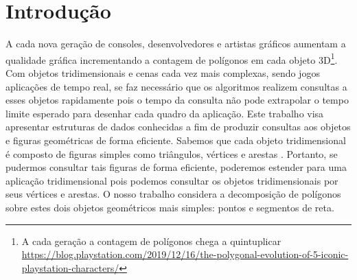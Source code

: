 \chapter{Introdução}\label{cap:intro}

A cada nova geração de consoles, desenvolvedores e artistas gráficos aumentam a  qualidade gráfica incrementando a contagem de polígonos em cada objeto 3D\footnote{A cada geração a contagem de polígonos chega a quintuplicar \url{https://blog.playstation.com/2019/12/16/the-polygonal-evolution-of-5-iconic-playstation-characters/}}. Com objetos tridimensionais e cenas cada vez mais complexas, sendo jogos aplicações de tempo real, se faz necessário que os algoritmos realizem consultas a esses objetos rapidamente pois o tempo da consulta não pode extrapolar o tempo limite esperado para desenhar cada quadro da aplicação.
Este trabalho visa apresentar estruturas de dados conhecidas a fim de produzir consultas aos objetos e figuras geométricas de forma eficiente. Sabemos que cada objeto tridimensional é composto de figuras simples como triângulos, vértices e arestas \cite{opengl}. Portanto, se pudermos consultar tais figuras de forma eficiente, poderemos estender para uma aplicação tridimensional pois podemos consultar os objetos tridimensionais por seus vértices e arestas. O nosso trabalho considera a decomposição de polígonos sobre estes dois objetos geométricos mais simples: pontos e segmentos de reta.

